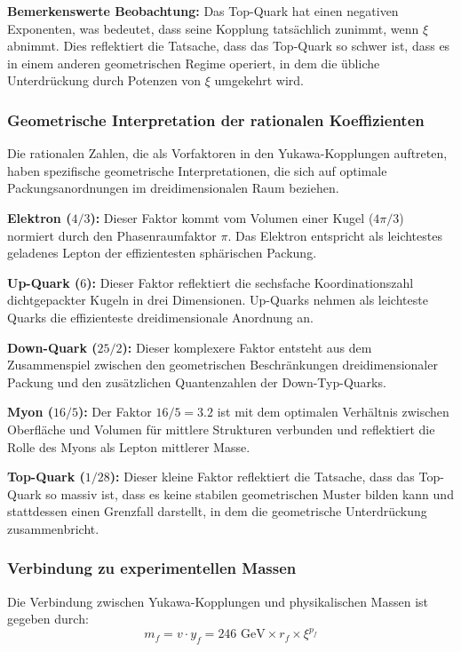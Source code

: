 \documentclass[12pt,a4paper]{article}
\newcommand{\xigeom}{\xi}
\begin{document}
	\textbf{Bemerkenswerte Beobachtung:} Das Top-Quark hat einen negativen Exponenten, was bedeutet, dass seine Kopplung tatsächlich zunimmt, wenn $\xigeom$ abnimmt. Dies reflektiert die Tatsache, dass das Top-Quark so schwer ist, dass es in einem anderen geometrischen Regime operiert, in dem die übliche Unterdrückung durch Potenzen von $\xigeom$ umgekehrt wird.
	
	\subsubsection{Geometrische Interpretation der rationalen Koeffizienten}
	
	Die rationalen Zahlen, die als Vorfaktoren in den Yukawa-Kopplungen auftreten, haben spezifische geometrische Interpretationen, die sich auf optimale Packungsanordnungen im dreidimensionalen Raum beziehen.
	
	\textbf{Elektron ($4/3$):} Dieser Faktor kommt vom Volumen einer Kugel ($4\pi/3$) normiert durch den Phasenraumfaktor $\pi$. Das Elektron entspricht als leichtestes geladenes Lepton der effizientesten sphärischen Packung.
	
	\textbf{Up-Quark ($6$):} Dieser Faktor reflektiert die sechsfache Koordinationszahl dichtgepackter Kugeln in drei Dimensionen. Up-Quarks nehmen als leichteste Quarks die effizienteste dreidimensionale Anordnung an.
	
	\textbf{Down-Quark ($25/2$):} Dieser komplexere Faktor entsteht aus dem Zusammenspiel zwischen den geometrischen Beschränkungen dreidimensionaler Packung und den zusätzlichen Quantenzahlen der Down-Typ-Quarks.
	
	\textbf{Myon ($16/5$):} Der Faktor $16/5 = 3.2$ ist mit dem optimalen Verhältnis zwischen Oberfläche und Volumen für mittlere Strukturen verbunden und reflektiert die Rolle des Myons als Lepton mittlerer Masse.
	
	\textbf{Top-Quark ($1/28$):} Dieser kleine Faktor reflektiert die Tatsache, dass das Top-Quark so massiv ist, dass es keine stabilen geometrischen Muster bilden kann und stattdessen einen Grenzfall darstellt, in dem die geometrische Unterdrückung zusammenbricht.
	
	\subsubsection{Verbindung zu experimentellen Massen}
	
	Die Verbindung zwischen Yukawa-Kopplungen und physikalischen Massen ist gegeben durch:
	\begin{equation}
		m_f = v \cdot y_f = 246 \text{ GeV} \times r_f \times \xigeom^{p_f}
	\end{equation}
	
\end{document}
